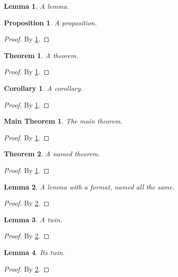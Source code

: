\documentclass{article}
\newtheorem{theorem}{Theorem}
\newtheorem{lemma}{Lemma}
\newtheorem{proposition}{Proposition}
\newtheorem{corollary}{Corollary}
\newtheorem*{mainthm}{Main Theorem}
\begin{document}
\begin{lemma}\label{l}A lemma.\end{lemma}
\begin{proposition}\label{p}A proposition.\end{proposition}
\begin{proof}By \ref{l}.\end{proof}
\begin{theorem}\label{t}A theorem.\end{theorem}
\begin{proof}By \ref{p}.\end{proof}
\begin{corollary}\label{c}A corollary.\end{corollary}
\begin{proof}By \ref{t}.\end{proof}
\begin{mainthm}\label{m}The main theorem.\end{mainthm}
\begin{proof}By \ref{c}.\end{proof}
\begin{theorem}\label{r}
A named theorem.\end{theorem}
\begin{proof}By \ref{m}.\end{proof}
\begin{lemma}\label{q} 
A lemma with a format, named all the same.\end{lemma}
\begin{proof}By \ref{r}.\end{proof}
\begin{lemma}\label{d1}A twin.\end{lemma}
\begin{proof}By \ref{q}.\end{proof}
\begin{lemma}\label{d2}Its twin.\end{lemma}
\begin{proof}By \ref{r}.\end{proof}
\end{document}
